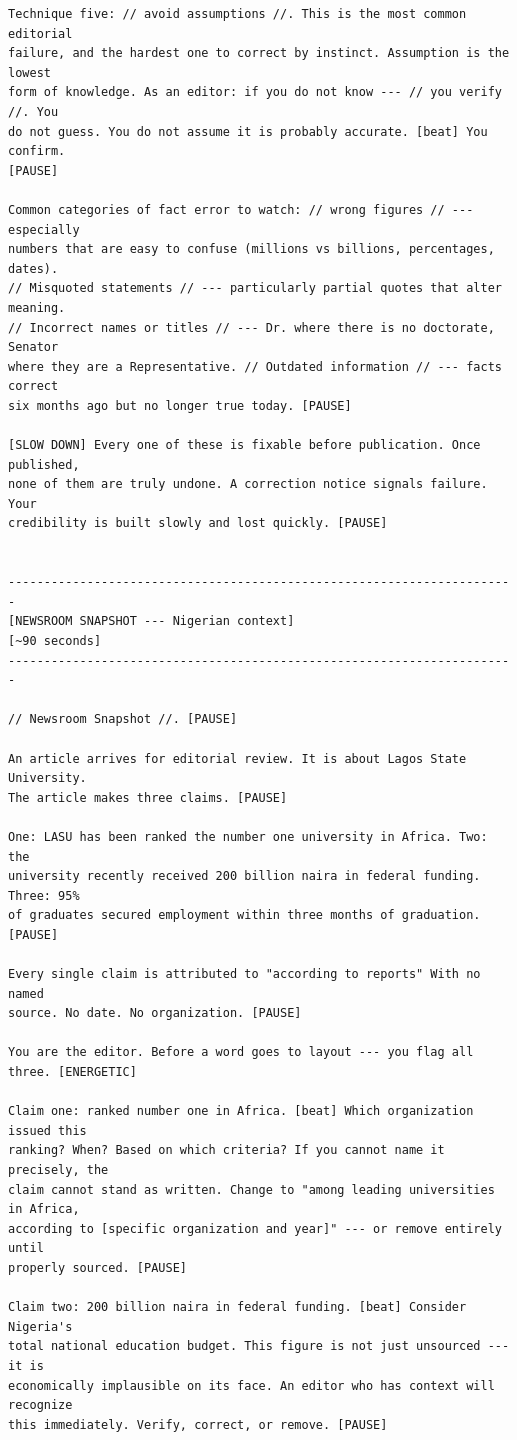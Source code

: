 {\begin{Verbatim}
Technique five: // avoid assumptions //. This is the most common editorial
failure, and the hardest one to correct by instinct. Assumption is the lowest
form of knowledge. As an editor: if you do not know --- // you verify //. You
do not guess. You do not assume it is probably accurate. [beat] You confirm.
[PAUSE]

Common categories of fact error to watch: // wrong figures // --- especially
numbers that are easy to confuse (millions vs billions, percentages, dates).
// Misquoted statements // --- particularly partial quotes that alter meaning.
// Incorrect names or titles // --- Dr. where there is no doctorate, Senator
where they are a Representative. // Outdated information // --- facts correct
six months ago but no longer true today. [PAUSE]

[SLOW DOWN] Every one of these is fixable before publication. Once published,
none of them are truly undone. A correction notice signals failure. Your
credibility is built slowly and lost quickly. [PAUSE]


-----------------------------------------------------------------------
[NEWSROOM SNAPSHOT --- Nigerian context]
[~90 seconds]
-----------------------------------------------------------------------

// Newsroom Snapshot //. [PAUSE]

An article arrives for editorial review. It is about Lagos State University.
The article makes three claims. [PAUSE]

One: LASU has been ranked the number one university in Africa. Two: the
university recently received 200 billion naira in federal funding. Three: 95%
of graduates secured employment within three months of graduation. [PAUSE]

Every single claim is attributed to "according to reports" With no named
source. No date. No organization. [PAUSE]

You are the editor. Before a word goes to layout --- you flag all three. [ENERGETIC]

Claim one: ranked number one in Africa. [beat] Which organization issued this
ranking? When? Based on which criteria? If you cannot name it precisely, the
claim cannot stand as written. Change to "among leading universities in Africa,
according to [specific organization and year]" --- or remove entirely until
properly sourced. [PAUSE]

Claim two: 200 billion naira in federal funding. [beat] Consider Nigeria's
total national education budget. This figure is not just unsourced --- it is
economically implausible on its face. An editor who has context will recognize
this immediately. Verify, correct, or remove. [PAUSE]


\end{Verbatim}}
